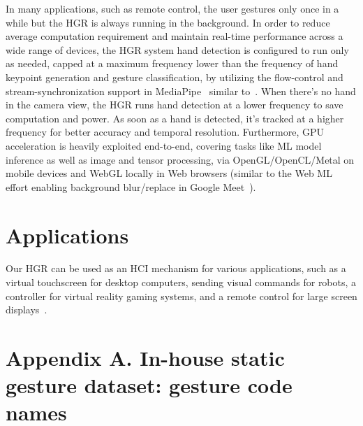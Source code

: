 \documentclass[10pt,twocolumn,letterpaper]{article}
\begin{document}
In many applications, such as remote control, the user gestures only once in a while but the HGR is always running in the background. In order to reduce average computation requirement and maintain real-time performance across a wide range of devices, the HGR system hand detection is configured to run only as needed, capped at a maximum frequency lower than the frequency of hand keypoint generation and gesture classification, by utilizing the flow-control and stream-synchronization support in MediaPipe~\cite{mediapipe} similar to~\cite{zhang20}. When there’s no hand in the camera view, the HGR runs hand detection at a lower frequency to save computation and power. As soon as a hand is detected, it’s tracked at a higher frequency for better accuracy and temporal resolution. Furthermore, GPU acceleration is heavily exploited end-to-end, covering tasks like ML model inference as well as image and tensor processing, via OpenGL/OpenCL/Metal on mobile devices and WebGL locally in Web browsers (similar to the Web ML effort enabling background blur/replace in Google Meet~\cite{segmentation_aiblog}).


\section{Applications}

Our HGR can be used as an HCI mechanism for various applications, such as a virtual touchscreen for desktop computers, sending visual commands for robots, a controller for virtual reality gaming systems, and a remote control for large screen displays~\cite{rautaray2015vision}.

{\small


}

\newpage
\section*{Appendix A. In-house static gesture dataset: gesture code names} \label{sect:appendixa}
\end{document}
